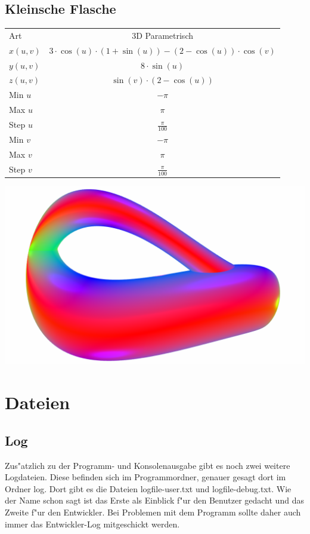 \documentclass{scrartcl}
\begin{document}
\subsection{Kleinsche Flasche}
\begin{tabular}[b]{|l|c|}
\hline
\rowcolor[gray]{0.5}
Art &  3D Parametrisch \\
\rowcolor[gray]{1}
\(x(u,v)\) & \(3 \cdot \cos(u) \cdot (1+\sin(u))-(2-\cos(u)) \cdot \cos(v)\) \\
\rowcolor[gray]{0.5}
\(y(u,v)\) & \(8 \cdot \sin(u)\) \\
\rowcolor[gray]{1}
\(z(u,v)\) & \(\sin(v) \cdot(2-\cos(u))\) \\
\rowcolor[gray]{0.5}
Min \(u\) & \(-\pi\) \\
\rowcolor[gray]{1}
Max \(u\) & \(\pi\) \\
\rowcolor[gray]{0.5}
Step \(u\) & \(\frac{\pi}{100}\) \\
\rowcolor[gray]{1}
Min \(v\) & \(-\pi\) \\
\rowcolor[gray]{0.5}
Max \(v\) & \(\pi\) \\
\rowcolor[gray]{1}
Step \(v\) &\(\frac{\pi}{100}\) \\
\hline
\end{tabular}
\includegraphics[height=0.22\textheight]{images/graphs/kleinsche_flasche.png}
\newpage
\section{Dateien}
\subsection{Log}
\label{chp:Log}
Zus"atzlich zu der Programm- und Konsolenausgabe gibt es noch zwei weitere Logdateien. Diese befinden sich im Programmordner, genauer gesagt dort im Ordner log. Dort gibt es die Dateien logfile-user.txt und logfile-debug.txt. Wie der Name schon sagt ist das Erste als Einblick f"ur den Benutzer gedacht und das Zweite f"ur den Entwickler. Bei Problemen mit dem Programm sollte daher auch immer das Entwickler-Log mitgeschickt werden.
\end{document}
